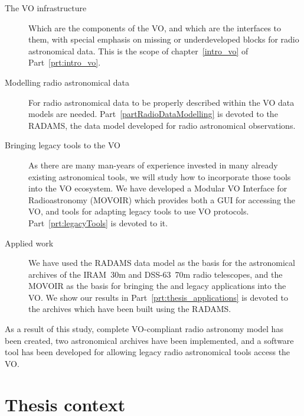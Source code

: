 	\begin{description}
	
		\item [The VO infrastructure] Which are the components of
		the VO, and which are the interfaces to them, with special
		emphasis on missing or underdeveloped blocks for radio
		astronomical data. This is the scope of
		chapter~\ref{intro_vo} of Part~\ref{prt:intro_vo}.
	
		 \item[Modelling radio astronomical data] For radio
		astronomical data to be properly described within the VO
		data models are needed. Part~\ref{partRadioDataModelling} is
		devoted to the RADAMS, the data model developed for radio
		astronomical observations.
	
		 \item [Bringing legacy tools to the VO] As there are many
		man-years of experience invested in many already existing
		astronomical tools, we will study how to incorporate those
		tools into the VO ecosystem. We have developed a Modular VO
		Interface for Radioastronomy (MOVOIR) which provides both a
		GUI for accessing the VO, and tools for adapting legacy
		tools to use VO protocols. Part~\ref{prt:legacyTools} is
		devoted to it.
	
		 \item [Applied work] We have used the RADAMS data model as
		the basis for the astronomical archives of the IRAM~30m and
		DSS-63~70m radio telescopes, and the MOVOIR as the basis for
		bringing the \massa{} and \madcuba{} legacy
		applications into the VO. We show our results in
		Part~\ref{prt:thesis_applications} is devoted to the
		archives which have been built using the RADAMS.
	
	
	\end{description}

	As a result of this study, complete VO-compliant radio astronomy
	model has been created, two astronomical archives have been
	implemented, and a software tool has been developed for allowing
	legacy radio astronomical tools access the VO.



\section{Thesis context} %
\label{sec:thesis_context}

